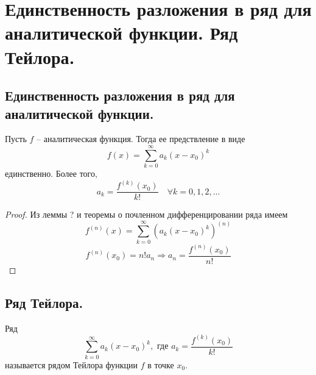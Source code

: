\section{Единственность разложения в ряд для аналитической функции. Ряд Тейлора.}

\subsection{Единственность разложения в ряд для аналитической функции.}
\begin{theorem}
    Пусть $f$ -- аналитическая функция. Тогда ее предствление в виде $$f(x) = \sum_{k=0}^{\infty} a_k (x - x_0)^k$$ единственно. Более того, 
    \[
        a_k = \frac{f^{(k)}(x_0)}{k!}
        \quad
        \forall k = 0,1,2,...
    \]
    \begin{proof}
        Из леммы ? и теоремы о почленном дифференцировании ряда имеем
        \[
            f^{(n)}(x) = \sum_{k=0}^{\infty} (a_k (x - x_0)^k)^{(n)}
        \]
        \[
            f^{(n)}(x_0) = n! a_n \Rightarrow a_n = \frac{f^{(n)}(x_0)}{n!}
        \]
    \end{proof}
\end{theorem}

\subsection{Ряд Тейлора.}
\begin{definition}
    Ряд
    \[
        \sum_{k=0}^{\infty} a_k (x - x_0)^k, \text{ где }
        a_k = \frac{f^{(k)}(x_0)}{k!}
    \] называется рядом Тейлора функции $f$ в точке $x_0$.
\end{definition}